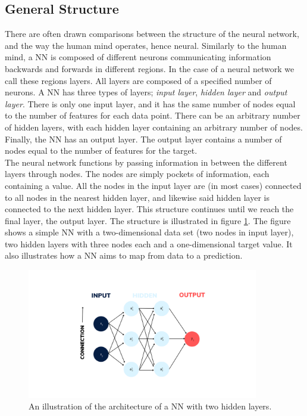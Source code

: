 \subsection{General Structure}
There are often drawn comparisons between the structure of the neural network, 
and the way the human mind operates, hence neural. Similarly to the human mind, a \ac{NN} is 
composed of different neurons communicating information backwards and forwards in different 
regions. In the case of a neural network we call these regions layers. All layers
are composed of a specified number of neurons. A \ac{NN} has three types of layers;
\emph{input layer}, \emph{hidden layer} and \emph{output layer}. There is only one input layer, and it has
the same number of nodes equal to the number of features for each data point. 
There can be an arbitrary number of hidden layers, with each hidden layer containing
an arbitrary number of nodes. Finally, the \ac{NN} has an output layer. The output layer
contains a number of nodes equal to the number of features for the target.
\\
The neural network functions by passing information in between the different layers through 
nodes. The nodes are simply pockets of information, each containing a value. 
All the nodes in the input layer are (in most cases) connected to all nodes in the nearest hidden layer,
and likewise said hidden layer is connected to the next hidden layer. This structure continues
until we reach the final layer, the output layer. The structure is illustrated in figure
\ref{fig:NN}. The figure shows a simple \ac{NN} with a two-dimensional data set (two nodes in input layer),
two hidden layers with three nodes each and a one-dimensional target value. It also illustrates 
how a \ac{NN} aims to map from data to a prediction.
\begin{figure}
    \centering
    \vspace*{-12.5mm} 
    \includegraphics[width=0.9\textwidth]{Figures/Illustrations/Input_labels.png}
    \vspace*{-12.5mm} 
    \caption{An illustration of the architecture of a \acs{NN} with two hidden layers.}
    \label{fig:NN}
\end{figure}
